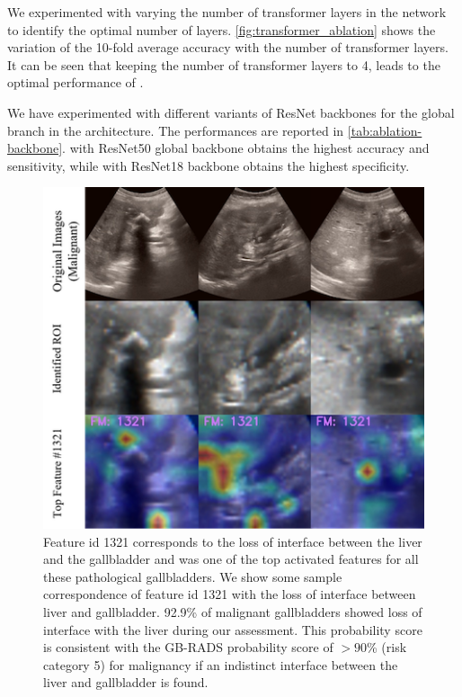 %
We experimented with varying the number of transformer layers in the \radformer network to identify the optimal number of layers. \cref{fig:transformer_ablation} shows the variation of the 10-fold average accuracy with the number of transformer layers. It can be seen that keeping the number of transformer layers to 4, leads to the optimal performance of \radformer.
%

%
We have experimented with different variants of ResNet backbones for the global branch in the \radformer architecture. The performances are reported in \cref{tab:ablation-backbone}. \radformer with ResNet50 global backbone obtains the highest accuracy and sensitivity, while \radformer with ResNet18 backbone obtains the highest specificity.

\begin{figure}[t]
	\centering
	\includegraphics[width=0.6\linewidth]{figs/radformer/malg-1321.png}
	\caption[Visualization of a malignant feature]{Feature id 1321 corresponds to the loss of interface between the liver and the gallbladder and was one of the top activated features for all these pathological gallbladders. We show some sample correspondence of feature id 1321 with the loss of interface between liver and gallbladder. 92.9\% of malignant gallbladders showed loss of interface with the liver during our assessment. This probability score is consistent with the GB-RADS probability score of $>\!90$\% (risk category 5) for malignancy if an indistinct interface between the liver and gallbladder is found.}
	\label{fig:malg_corr_1}
\end{figure}

